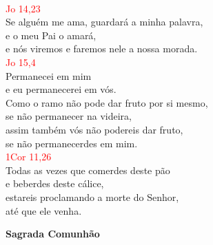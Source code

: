 \documentclass{book}
\begin{document}
\begin{flushleft}
    \vspace{.1cm} \\
    \textcolor{red}{Jo 14,23}
    \vspace{.1cm} \\
    Se alguém me ama, guardará a minha palavra, \\
    e o meu Pai o amará, \\
    e nós viremos e faremos nele a nossa morada.
    \vspace{.1cm} \\
    \textcolor{red}{Jo 15,4}
    \vspace{.1cm} \\
    Permanecei em mim \\
    e eu permanecerei em vós. \\
    Como o ramo não pode dar fruto por si mesmo, \\
    se não permanecer na videira, \\
    assim também vós não podereis dar fruto, \\
    se não permanecerdes em mim.
    \vspace{.1cm} \\
    \textcolor{red}{1Cor 11,26}
    \vspace{.1cm} \\
    Todas as vezes que comerdes deste pão \\
    e beberdes deste cálice, \\
    estareis proclamando a morte do Senhor, \\
    até que ele venha.
\end{flushleft}
\begin{center}
    \textbf{Sagrada Comunhão}
\end{center}
\end{document}
